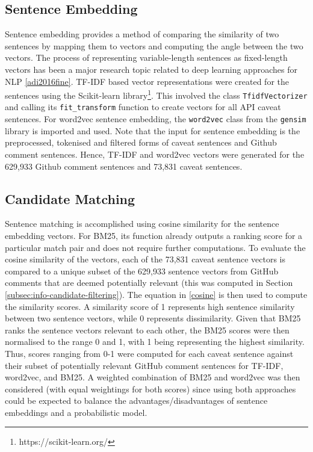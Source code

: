 \subsection{Sentence Embedding}
\label{subsec:info-sentence-embedding}
Sentence embedding provides a method of comparing the similarity of two sentences by mapping them to vectors and computing the angle between the two vectors. The process of representing variable-length sentences as fixed-length vectors has been a major research topic related to deep learning approaches for NLP \ref{adi2016fine}.
TF-IDF based vector representations were created for the sentences using the Scikit-learn library\footnote{https://scikit-learn.org/}. This involved the class \lstinline{TfidfVectorizer} and calling its \lstinline{fit_transform} function to create vectors for all API caveat sentences. For word2vec sentence embedding, the \lstinline{word2vec} class from the \lstinline{gensim} library is imported and used. Note that the input for sentence embedding is the preprocessed, tokenised and filtered forms of caveat sentences and Github comment sentences. Hence, TF-IDF and word2vec vectors were generated for the 629,933 Github comment sentences and 73,831 caveat sentences.

\subsection{Candidate Matching}
\label{subsec:info-candidate-match}
Sentence matching is accomplished using cosine similarity for the sentence embedding vectors. For BM25, its function already outputs a ranking score for a particular match pair and does not require further computations. To evaluate the cosine similarity of the vectors, each of the 73,831 caveat sentence vectors is compared to a unique subset of the 629,933 sentence vectors from GitHub comments that are deemed potentially relevant (this was computed in Section \ref{subsec:info-candidate-filtering}). The equation in \ref{cosine} is then used to compute the similarity scores. A similarity score of 1 represents high sentence similarity between two sentence vectors, while 0 represents dissimilarity. Given that BM25 ranks the sentence vectors relevant to each other, the BM25 scores were then normalised to the range 0 and 1, with 1 being representing the highest similarity. Thus, scores ranging from 0-1 were computed for each caveat sentence against their subset of potentially relevant GitHub comment sentences for TF-IDF, word2vec, and BM25. A weighted combination of BM25 and word2vec was then considered (with equal weightings for both scores) since using both approaches could be expected to balance the advantages/disadvantages of sentence embeddings and a probabilistic model. \\

